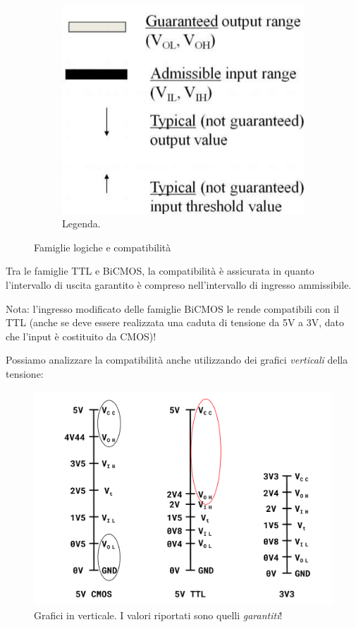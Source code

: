 \documentclass[
]{book}
\begin{document}
\begin{figure}[H]
\begin{subfigure}{0.3\textwidth}
\includegraphics[width=\textwidth]{assets/imgs/legenda.png}
\caption{Legenda.}
\end{subfigure}
\caption{Famiglie logiche e compatibilità}
\end{figure}

Tra le famiglie TTL e BiCMOS, la compatibilità è assicurata in quanto
l'intervallo di uscita garantito è compreso nell'intervallo di ingresso
ammissibile.

Nota: l'ingresso modificato delle famiglie BiCMOS le rende compatibili
con il TTL (anche se deve essere realizzata una caduta di tensione da 5V
a 3V, dato che l'input è costituito da CMOS)!

Possiamo analizzare la compatibilità anche utilizzando dei grafici
\emph{verticali} della tensione:

\begin{figure}
\centering
\includegraphics[width=0.5\linewidth,height=\textheight,keepaspectratio]{immagini/36.png}
\caption{Grafici in verticale. I valori riportati sono quelli
\emph{garantiti}!}
\end{figure}
\end{document}
